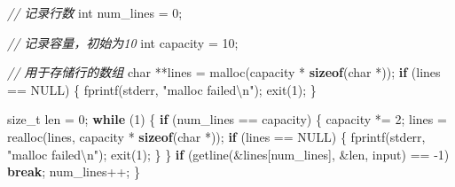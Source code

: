\documentclass[
]{article}
\newenvironment{Shaded}{}{}
\newcommand{\CommentTok}[1]{\textcolor[rgb]{0.38,0.63,0.69}{\textit{#1}}}
\newcommand{\ControlFlowTok}[1]{\textcolor[rgb]{0.00,0.44,0.13}{\textbf{#1}}}
\newcommand{\DataTypeTok}[1]{\textcolor[rgb]{0.56,0.13,0.00}{#1}}
\newcommand{\DecValTok}[1]{\textcolor[rgb]{0.25,0.63,0.44}{#1}}
\newcommand{\KeywordTok}[1]{\textcolor[rgb]{0.00,0.44,0.13}{\textbf{#1}}}
\newcommand{\NormalTok}[1]{#1}
\newcommand{\OperatorTok}[1]{\textcolor[rgb]{0.40,0.40,0.40}{#1}}
\newcommand{\SpecialCharTok}[1]{\textcolor[rgb]{0.25,0.44,0.63}{#1}}
\newcommand{\StringTok}[1]{\textcolor[rgb]{0.25,0.44,0.63}{#1}}
\begin{document}
\begin{Shaded}
	\begin{Highlighting}[]
		\CommentTok{// 记录行数}
		\DataTypeTok{int}\NormalTok{ num\_lines }\OperatorTok{=} \DecValTok{0}\OperatorTok{;}

		\CommentTok{// 记录容量，初始为10}
		\DataTypeTok{int}\NormalTok{ capacity }\OperatorTok{=} \DecValTok{10}\OperatorTok{;}

		\CommentTok{// 用于存储行的数组}
		\DataTypeTok{char} \OperatorTok{**}\NormalTok{lines }\OperatorTok{=}\NormalTok{ malloc}\OperatorTok{(}\NormalTok{capacity }\OperatorTok{*} \KeywordTok{sizeof}\OperatorTok{(}\DataTypeTok{char} \OperatorTok{*));}
		\ControlFlowTok{if} \OperatorTok{(}\NormalTok{lines }\OperatorTok{==}\NormalTok{ NULL}\OperatorTok{)} \OperatorTok{\{}
		\NormalTok{    fprintf}\OperatorTok{(}\NormalTok{stderr}\OperatorTok{,} \StringTok{"malloc failed}\SpecialCharTok{\textbackslash{}n}\StringTok{"}\OperatorTok{);}
		\NormalTok{    exit}\OperatorTok{(}\DecValTok{1}\OperatorTok{);}
		\OperatorTok{\}}

		\DataTypeTok{size\_t}\NormalTok{ len }\OperatorTok{=} \DecValTok{0}\OperatorTok{;}
		\ControlFlowTok{while} \OperatorTok{(}\DecValTok{1}\OperatorTok{)} \OperatorTok{\{}
		\ControlFlowTok{if} \OperatorTok{(}\NormalTok{num\_lines }\OperatorTok{==}\NormalTok{ capacity}\OperatorTok{)} \OperatorTok{\{}
		\NormalTok{        capacity }\OperatorTok{*=} \DecValTok{2}\OperatorTok{;}
		\NormalTok{        lines }\OperatorTok{=}\NormalTok{ realloc}\OperatorTok{(}\NormalTok{lines}\OperatorTok{,}\NormalTok{ capacity }\OperatorTok{*} \KeywordTok{sizeof}\OperatorTok{(}\DataTypeTok{char} \OperatorTok{*));}
		\ControlFlowTok{if} \OperatorTok{(}\NormalTok{lines }\OperatorTok{==}\NormalTok{ NULL}\OperatorTok{)} \OperatorTok{\{}
		\NormalTok{            fprintf}\OperatorTok{(}\NormalTok{stderr}\OperatorTok{,} \StringTok{"malloc failed}\SpecialCharTok{\textbackslash{}n}\StringTok{"}\OperatorTok{);}
		\NormalTok{            exit}\OperatorTok{(}\DecValTok{1}\OperatorTok{);}
		\OperatorTok{\}}
		\OperatorTok{\}}
		\ControlFlowTok{if} \OperatorTok{(}\NormalTok{getline}\OperatorTok{(\&}\NormalTok{lines}\OperatorTok{[}\NormalTok{num\_lines}\OperatorTok{],} \OperatorTok{\&}\NormalTok{len}\OperatorTok{,}\NormalTok{ input}\OperatorTok{)} \OperatorTok{==} \OperatorTok{{-}}\DecValTok{1}\OperatorTok{)}
		\ControlFlowTok{break}\OperatorTok{;}
		\NormalTok{    num\_lines}\OperatorTok{++;}
		\OperatorTok{\}}
	\end{Highlighting}
\end{Shaded}
\end{document}
